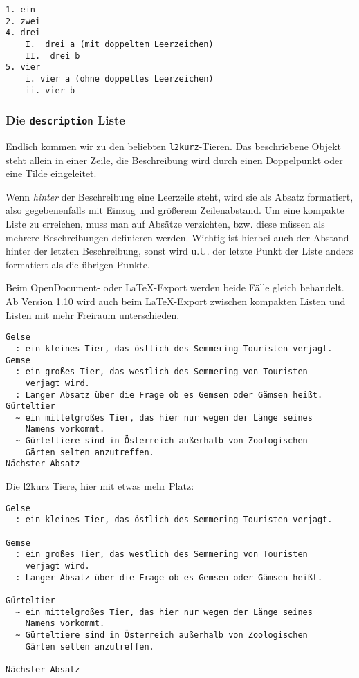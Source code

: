 \documentclass[11pt,ngerman,a4paper]{article}
\begin{document}
\begin{verbatim}
1. ein
2. zwei
4. drei
    I.  drei a (mit doppeltem Leerzeichen)
    II.  drei b
5. vier
    i. vier a (ohne doppeltes Leerzeichen)
    ii. vier b
\end{verbatim}

\subsubsection{Die \texttt{description}
Liste}\label{die-description-liste}

Endlich kommen wir zu den beliebten \texttt{l2kurz}-Tieren. Das
beschriebene Objekt steht allein in einer Zeile, die Beschreibung wird
durch einen Doppelpunkt oder eine Tilde eingeleitet.

Wenn \emph{hinter} der Beschreibung eine Leerzeile steht, wird sie als
Absatz formatiert, also gegebenenfalls mit Einzug und größerem
Zeilenabstand. Um eine kompakte Liste zu erreichen, muss man auf Absätze
verzichten, bzw. diese müssen als mehrere Beschreibungen definieren
werden. Wichtig ist hierbei auch der Abstand hinter der letzten
Beschreibung, sonst wird u.U. der letzte Punkt der Liste anders
formatiert als die übrigen Punkte.

Beim OpenDocument- oder LaTeX-Export werden beide Fälle gleich
behandelt. Ab Version 1.10 wird auch beim LaTeX-Export zwischen
kompakten Listen und Listen mit mehr Freiraum unterschieden.

\begin{verbatim}
Gelse
  : ein kleines Tier, das östlich des Semmering Touristen verjagt.
Gemse
  : ein großes Tier, das westlich des Semmering von Touristen 
    verjagt wird.
  : Langer Absatz über die Frage ob es Gemsen oder Gämsen heißt.
Gürteltier
  ~ ein mittelgroßes Tier, das hier nur wegen der Länge seines 
    Namens vorkommt.
  ~ Gürteltiere sind in Österreich außerhalb von Zoologischen 
    Gärten selten anzutreffen.
Nächster Absatz
\end{verbatim}

Die l2kurz Tiere, hier mit etwas mehr Platz:

\begin{verbatim}
Gelse
  : ein kleines Tier, das östlich des Semmering Touristen verjagt.

Gemse
  : ein großes Tier, das westlich des Semmering von Touristen 
    verjagt wird.
  : Langer Absatz über die Frage ob es Gemsen oder Gämsen heißt.

Gürteltier
  ~ ein mittelgroßes Tier, das hier nur wegen der Länge seines 
    Namens vorkommt.
  ~ Gürteltiere sind in Österreich außerhalb von Zoologischen 
    Gärten selten anzutreffen.

Nächster Absatz
\end{verbatim}
\end{document}
